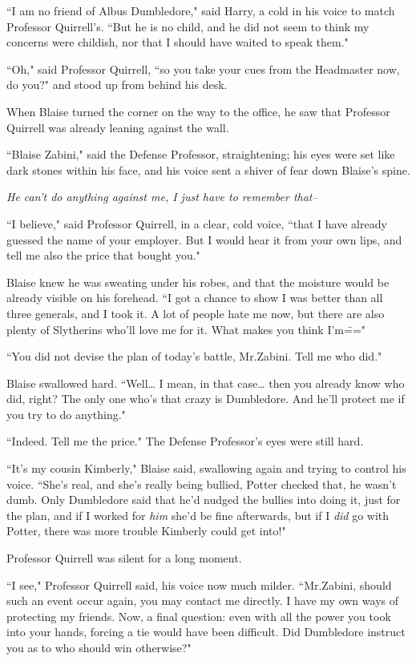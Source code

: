 ``I am no friend of Albus Dumbledore," said Harry, a cold in his voice to match Professor Quirrell's. ``But he is no child, and he did not seem to think my concerns were childish, nor that I should have waited to speak them."

``Oh," said Professor Quirrell, ``so you take your cues from the Headmaster now, do you?" and stood up from behind his desk.

\later

When Blaise turned the corner on the way to the office, he saw that Professor Quirrell was already leaning against the wall.

``Blaise Zabini," said the Defense Professor, straightening; his eyes were set like dark stones within his face, and his voice sent a shiver of fear down Blaise's spine.

\emph{He can't do anything against me, I just have to remember that\---}

``I believe," said Professor Quirrell, in a clear, cold voice, ``that I have already guessed the name of your employer. But I would hear it from your own lips, and tell me also the price that bought you."

Blaise knew he was sweating under his robes, and that the moisture would be already visible on his forehead. ``I got a chance to show I was better than all three generals, and I took it. A lot of people hate me now, but there are also plenty of Slytherins who'll love me for it. What makes you think I'm\==="

``You did not devise the plan of today's battle, Mr.\?Zabini. Tell me who did."

Blaise swallowed hard. ``Well{\ldots} I mean, in that case{\ldots} then you already know who did, right? The only one who's that crazy is Dumbledore. And he'll protect me if you try to do anything."

``Indeed. Tell me the price." The Defense Professor's eyes were still hard.

``It's my cousin Kimberly," Blaise said, swallowing again and trying to control his voice. ``She's real, and she's really being bullied, Potter checked that, he wasn't dumb. Only Dumbledore said that he'd nudged the bullies into doing it, just for the plan, and if I worked for \emph{him} she'd be fine afterwards, but if I \emph{did} go with Potter, there was more trouble Kimberly could get into!"

Professor Quirrell was silent for a long moment.

``I see," Professor Quirrell said, his voice now much milder. ``Mr.\?Zabini, should such an event occur again, you may contact me directly. I have my own ways of protecting my friends. Now, a final question: even with all the power you took into your hands, forcing a tie would have been difficult. Did Dumbledore instruct you as to who should win otherwise?"

